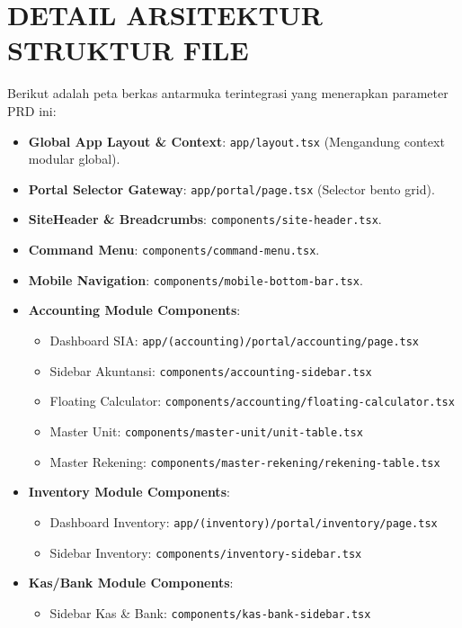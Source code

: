 \documentclass[11pt,a4paper]{article}
\begin{document}
\newpage

\section{DETAIL ARSITEKTUR STRUKTUR FILE}
Berikut adalah peta berkas antarmuka terintegrasi yang menerapkan parameter PRD ini:
\begin{itemize}
    \item \textbf{Global App Layout \& Context}: \texttt{app/layout.tsx} (Mengandung context modular global).
    \item \textbf{Portal Selector Gateway}: \texttt{app/portal/page.tsx} (Selector bento grid).
    \item \textbf{SiteHeader \& Breadcrumbs}: \texttt{components/site-header.tsx}.
    \item \textbf{Command Menu}: \texttt{components/command-menu.tsx}.
    \item \textbf{Mobile Navigation}: \texttt{components/mobile-bottom-bar.tsx}.
    \item \textbf{Accounting Module Components}:
    \begin{itemize}
        \item Dashboard SIA: \texttt{app/(accounting)/portal/accounting/page.tsx}
        \item Sidebar Akuntansi: \texttt{components/accounting-sidebar.tsx}
        \item Floating Calculator: \texttt{components/accounting/floating-calculator.tsx}
        \item Master Unit: \texttt{components/master-unit/unit-table.tsx}
        \item Master Rekening: \texttt{components/master-rekening/rekening-table.tsx}
    \end{itemize}
    \item \textbf{Inventory Module Components}:
    \begin{itemize}
        \item Dashboard Inventory: \texttt{app/(inventory)/portal/inventory/page.tsx}
        \item Sidebar Inventory: \texttt{components/inventory-sidebar.tsx}
    \end{itemize}
    \item \textbf{Kas/Bank Module Components}:
    \begin{itemize}
        \item Sidebar Kas \& Bank: \texttt{components/kas-bank-sidebar.tsx}

\end{itemize}
\end{itemize}
\end{document}
